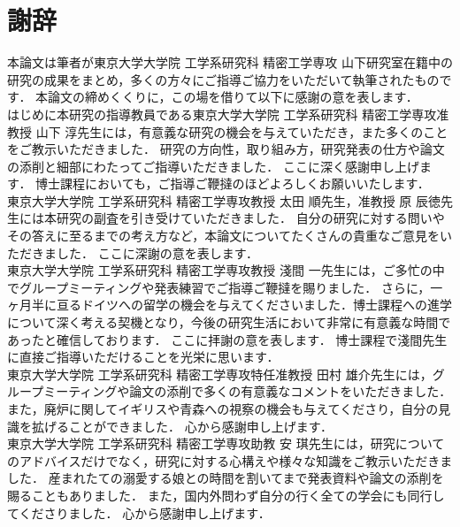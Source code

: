 \chapter*{謝辞}
\thispagestyle{empty}
\label{thankyou}

\newpage

本論文は筆者が東京大学大学院 工学系研究科 精密工学専攻 山下研究室在籍中の研究の成果をまとめ，多くの方々にご指導ご協力をいただいて執筆されたものです．
本論文の締めくくりに，この場を借りて以下に感謝の意を表します．\\

はじめに本研究の指導教員である東京大学大学院 工学系研究科 精密工学専攻准教授 山下 淳先生には，有意義な研究の機会を与えていただき，また多くのことをご教示いただきました．
研究の方向性，取り組み方，研究発表の仕方や論文の添削と細部にわたってご指導いただきました．
ここに深く感謝申し上げます．
博士課程においても，ご指導ご鞭撻のほどよろしくお願いいたします．
\\

東京大学大学院 工学系研究科 精密工学専攻教授 太田 順先生，准教授 原 辰徳先生には本研究の副査を引き受けていただきました．
自分の研究に対する問いやその答えに至るまでの考え方など，本論文についてたくさんの貴重なご意見をいただきました．
ここに深謝の意を表します．\\

東京大学大学院 工学系研究科 精密工学専攻教授 淺間 一先生には，ご多忙の中でグループミーティングや発表練習でご指導ご鞭撻を賜りました．
さらに，一ヶ月半に亘るドイツへの留学の機会を与えてくださいました．博士課程への進学について深く考える契機となり，今後の研究生活において非常に有意義な時間であったと確信しております．
ここに拝謝の意を表します．
博士課程で淺間先生に直接ご指導いただけることを光栄に思います．
\\

東京大学大学院 工学系研究科 精密工学専攻特任准教授 田村 雄介先生には，グループミーティングや論文の添削で多くの有意義なコメントをいただきました．
また，廃炉に関してイギリスや青森への視察の機会も与えてくださり，自分の見識を拡げることができました．
心から感謝申し上げます．\\

東京大学大学院 工学系研究科 精密工学専攻助教 安 琪先生には，研究についてのアドバイスだけでなく，研究に対する心構えや様々な知識をご教示いただきました．
産まれたての溺愛する娘との時間を割いてまで発表資料や論文の添削を賜ることもありました．
また，国内外問わず自分の行く全ての学会にも同行してくださりました．
心から感謝申し上げます．\\

